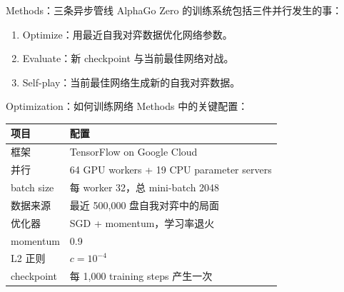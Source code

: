 \documentclass[UTF8,aspectratio=169,10pt]{ctexbeamer}
\begin{document}
\begin{frame}{Methods：三条异步管线}
  AlphaGo Zero 的训练系统包括三件并行发生的事：

  \begin{enumerate}
    \item Optimize：用最近自我对弈数据优化网络参数。
    \item Evaluate：新 checkpoint 与当前最佳网络对战。
    \item Self-play：当前最佳网络生成新的自我对弈数据。
  \end{enumerate}

  \begin{center}
  \end{center}
\end{frame}

\begin{frame}{Optimization：如何训练网络}
  \small
  Methods 中的关键配置：

  \begin{center}
    \begin{tabular}{@{}p{}p{}@{}}
      \toprule
      项目 & 配置 \\
      \midrule
      框架 & TensorFlow on Google Cloud \\
      并行 & 64 GPU workers + 19 CPU parameter servers \\
      batch size & 每 worker 32，总 mini-batch 2048 \\
      数据来源 & 最近 500,000 盘自我对弈中的局面 \\
      优化器 & SGD + momentum，学习率退火 \\
      momentum & 0.9 \\
      L2 正则 & $c=10^{-4}$ \\
      checkpoint & 每 1,000 training steps 产生一次 \\
      \bottomrule
    \end{tabular}
  \end{center}
\end{frame}
\end{document}
